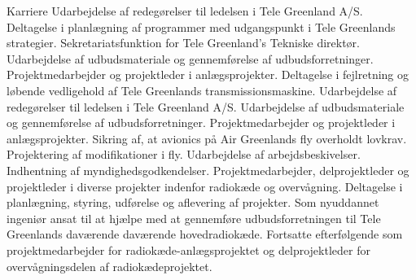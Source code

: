 \begin{rubric}{Karriere}
\entry*[feb 2016 - ] Udarbejdelse af redegørelser til ledelsen i Tele Greenland A/S.
\entry*Deltagelse i planlægning af programmer med udgangspunkt i Tele Greenlands strategier.
\entry*Sekretariatsfunktion for Tele Greenland's Tekniske direktør.
%
\entry*Udarbejdelse af udbudsmateriale og gennemførelse af udbudsforretninger.
\entry*Projektmedarbejder og projektleder i anlægsprojekter.
 Deltagelse i fejlretning og løbende vedligehold af Tele Greenlands transmissionsmaskine.
%
 Udarbejdelse af redegørelser til ledelsen i Tele Greenland A/S.
\entry*Udarbejdelse af udbudsmateriale og gennemførelse af udbudsforretninger.
\entry*Projektmedarbejder og projektleder i anlægsprojekter.
%
 Sikring af, at avionics på Air Greenlands fly overholdt lovkrav.
\entry*Projektering af modifikationer i fly.
\entry*Udarbejdelse af arbejdsbeskivelser.
\entry*Indhentning af myndighedsgodkendelser.
%
 Projektmedarbejder, delprojektleder og projektleder i diverse projekter indenfor radiokæde og overvågning.
\entry*Deltagelse i planlægning, styring, udførelse og aflevering af projekter.
%
 Som nyuddannet ingeniør ansat til at hjælpe med at gennemføre  udbudsforretningen til Tele Greenlands daværende daværende hovedradiokæde.
\entry*Fortsatte efterfølgende som projektmedarbejder for radiokæde-anlægsprojektet og delprojektleder for overvågningsdelen af radiokædeprojektet.
\end{rubric}
